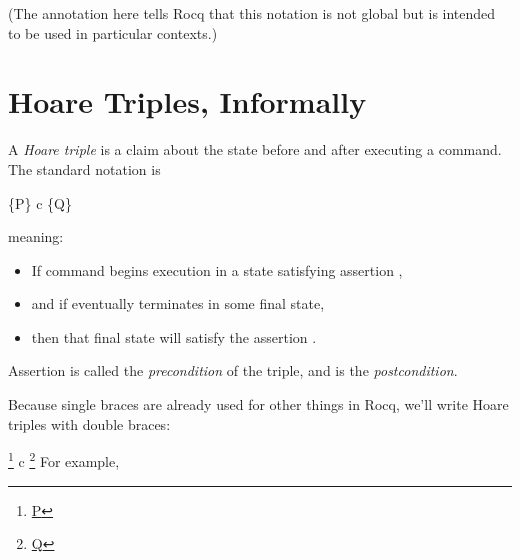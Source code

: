 \documentclass[12pt]{report}
\begin{document}
(The  annotation here tells Rocq that this
    notation is not global but is intended to be used in particular
    contexts.) 
\begin{coqdoccode}
\coqdocemptyline
\end{coqdoccode}
\section{Hoare Triples, Informally}



 A \textit{Hoare triple} is a claim about the state before and
    after executing a command.  The standard notation is


      \{P\} c \{Q\}


    meaning:



\begin{itemize}
\item  If command  begins execution in a state satisfying assertion ,

\item  and if  eventually terminates in some final state,

\item  then that final state will satisfy the assertion .

\end{itemize}


    Assertion  is called the \textit{precondition} of the triple, and  is
    the \textit{postcondition}.


    Because single braces are already used for other things in Rocq, we'll write
    Hoare triples with double braces:


       \footnote{\url{P}} c \footnote{\url{Q}}
 For example,
\end{document}
